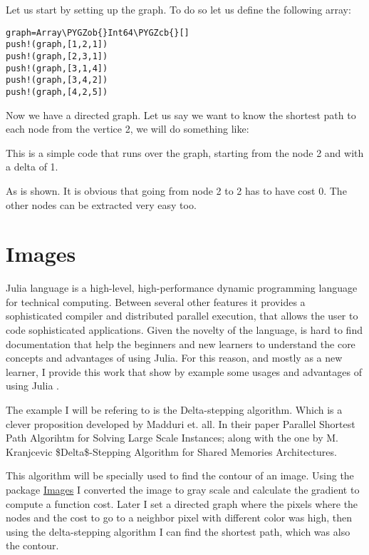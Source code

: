 \documentclass[letterpaper,10pt,english]{sphinxmanual}
\def\PYGZob{\char`\{}
\def\PYGZcb{\char`\}}
\begin{document}
Let us start by setting up the graph. To do so let us define the following array:

\begin{Verbatim}[commandchars=\\\{\}]
graph=Array\PYGZob{}Int64\PYGZcb{}[]
push!(graph,[1,2,1])
push!(graph,[2,3,1])
push!(graph,[3,1,4])
push!(graph,[3,4,2])
push!(graph,[4,2,5])
\end{Verbatim}



Now we have a directed graph. Let us say we want to know the shortest path to each node from the vertice 2, we will do something like:

This is a simple code that runs over the graph, starting from the node 2 and with a delta of 1.



As is shown. It is obvious that going from node 2 to 2 has to have cost 0. The other nodes can be extracted very easy too.


\chapter{Images}
\label{Images:images}\label{Images::doc}\label{Images:id1}
Julia language is a high-level, high-performance dynamic programming language for technical computing. Between several other features  it provides a sophisticated compiler and distributed parallel execution, that allows the user to code sophisticated applications. Given the novelty of the language, is hard to find documentation that help the beginners and new learners to understand the core concepts and advantages of using Julia. For this reason, and mostly as a new learner, I provide this work that show by example some usages and advantages of using Julia .

The example I will be refering to is the Delta-stepping algorithm. Which is a clever proposition developed by  Madduri et. all. In their paper Parallel Shortest Path Algorihtm for Solving Large Scale Instances; along with the one by M. Kranjcevic \$Delta\$-Stepping Algorithm for Shared Memories Architectures.

This algorithm will be specially used  to find the contour of an image. Using the package \href{https://github.com/timholy/Images.jl}{Images} I converted the image to gray scale and calculate the gradient to compute a function cost. Later I  set a directed graph where the pixels where the nodes and the cost to go to a neighbor pixel with different color was high, then using the delta-stepping algorithm I can find the shortest path, which was also the contour.
\end{document}
